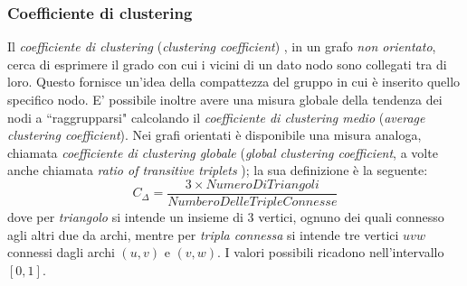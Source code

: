 \documentclass[a4paper,12pt]{article}
\begin{document}
\subsubsection{Coefficiente di clustering}
Il \textit{coefficiente di clustering} (\textit{clustering coefficient}) \cite{barabasi}, in un grafo \textit{non orientato}, cerca di esprimere il grado con cui i vicini di un dato nodo sono collegati tra di loro. Questo fornisce un'idea della compattezza del gruppo in cui è inserito quello specifico nodo. E' possibile inoltre avere una misura globale della tendenza dei nodi a ``raggrupparsi" calcolando il \textit{coefficiente di clustering medio} (\textit{average clustering coefficient}). Nei grafi orientati  \cite{newman} è disponibile una misura analoga, chiamata \textit{coefficiente di clustering globale} (\textit{global clustering coefficient}, a volte anche chiamata \textit{ratio of transitive triplets} \cite{barabasi}); la sua definizione è la seguente:
\begin{equation}
C_\Delta=\dfrac{3\times NumeroDiTriangoli}{NumberoDelleTripleConnesse}
\end{equation}
dove per \textit{triangolo} si intende un insieme di $3$ vertici, ognuno dei quali connesso agli altri due da archi, mentre per \textit{tripla connessa} si intende tre vertici $uvw$ connessi dagli archi $(u,v)$ e $(v,w)$. I valori possibili ricadono nell'intervallo $[0,1]$.
\end{document}

